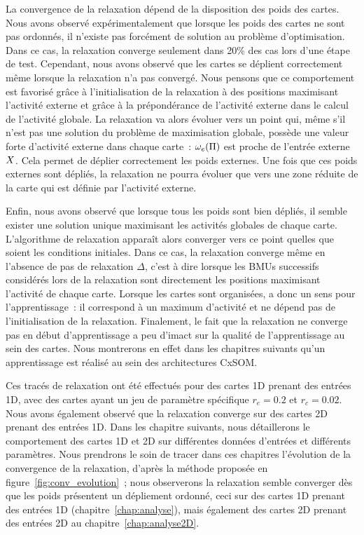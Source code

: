 \documentclass[../main]{subfiles}
\begin{document}
La convergence de la relaxation dépend de la disposition des poids des cartes.
Nous avons observé expérimentalement que lorsque les poids des cartes ne sont pas ordonnés, il n'existe pas forcément de solution au problème d'optimisation. 
Dans ce cas, la relaxation converge seulement dans 20\% des cas lors d'une étape de test.
Cependant, nous avons observé que les cartes se déplient correctement même lorsque la relaxation n'a pas convergé. Nous pensons que ce comportement est favorisé grâce à l'initialisation de la relaxation à des positions maximisant l'activité externe et grâce à la prépondérance de l'activité externe dans le calcul de l'activité globale. 
La relaxation va alors évoluer vers un point qui, même s'il n'est pas une solution du problème de maximisation globale, possède une valeur forte d'activité externe dans chaque carte~: $\omega_e(\Pi)$ est proche de l'entrée externe $X$. Cela permet de déplier correctement les poids externes. Une fois que ces poids externes sont dépliés, la relaxation ne pourra évoluer que vers une zone réduite de la carte qui est définie par l'activité externe.

Enfin, nous avons observé que lorsque tous les poids sont bien dépliés, il semble exister une solution unique maximisant les activités globales de chaque carte.
L'algorithme de relaxation apparaît alors converger vers ce point quelles que soient les conditions initiales.
Dans ce cas, la relaxation converge même en l'absence de pas de relaxation $\Delta$, c'est à dire lorsque les BMUs successifs considérés lors de la relaxation sont directement les positions maximisant l'activité de chaque carte.
Lorsque les cartes sont organisées, a donc un sens pour l'apprentissage~: il correspond à un maximum d'activité et ne dépend pas de l'initialisation de la relaxation.
Finalement, le fait que la relaxation ne converge pas en début d'apprentissage a peu d'imact sur la qualité de l'apprentissage au sein des cartes. Nous montrerons en effet dans les chapitres suivants qu'un apprentissage est réalisé au sein des architectures CxSOM.

Ces tracés de relaxation ont été effectués pour des cartes 1D prenant des entrées 1D, avec des cartes ayant un jeu de paramètre spécifique $r_e = 0.2$ et $r_c = 0.02$. 
Nous avons également observé que la relaxation converge sur des cartes 2D prenant des entrées 1D.
Dans les chapitre suivants, nous détaillerons le comportement des cartes 1D et 2D sur différentes données d'entrées et différents paramètres. Nous prendrons le soin de tracer dans ces chapitres l'évolution de la convergence de la relaxation, d'après la méthode proposée en figure~\ref{fig:conv_evolution}~; nous observerons la relaxation semble converger dès que les poids présentent un dépliement ordonné, ceci sur des cartes 1D prenant des entrées 1D (chapitre~\ref{chap:analyse}), mais également des cartes 2D prenant des entrées 2D au chapitre~\ref{chap:analyse2D}.

\ifSubfilesClassLoaded{
    \printbibliography
}{}
\end{document}
